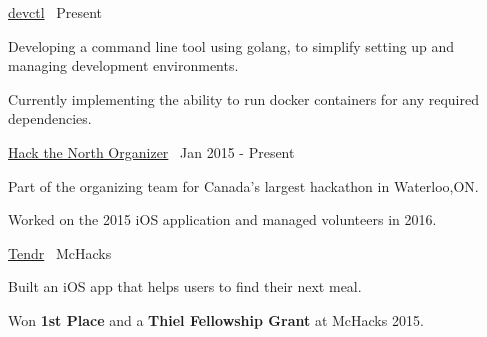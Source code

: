 

\begin{cventries}

  \cvprojectentry
    {\href{https://github.com/devctl/devctl}{devctl}\ \faPaperclip} %
    {Present}
    {
      \begin{cvitems} %
        \item {Developing a command line tool using golang, to simplify setting up and managing development environments.}
        \item {Currently implementing the ability to run docker containers for any required dependencies.}
      \end{cvitems}
    }

  \cvprojectentry
	{\href{https://hackthenorth.com}{Hack the North Organizer}\ \faPaperclip}    
	{Jan 2015 - Present}
    {
      \begin{cvitems} %
        \item {Part of the organizing team for Canada's largest hackathon in Waterloo,ON.}
        \item {Worked on the 2015 iOS application and managed volunteers in 2016.}
      \end{cvitems}
    }

  \cvprojectentry
    {\href{http://devpost.com/software/tendr}{Tendr}\ \faPaperclip} %
    {McHacks}
    {
      \begin{cvitems} %
        \item {Built an iOS app that helps users to find their next meal.}
        \item {Won \textbf{1st Place} and a \textbf{Thiel Fellowship Grant} at McHacks 2015.}
      \end{cvitems}
    }


\end{cventries}
